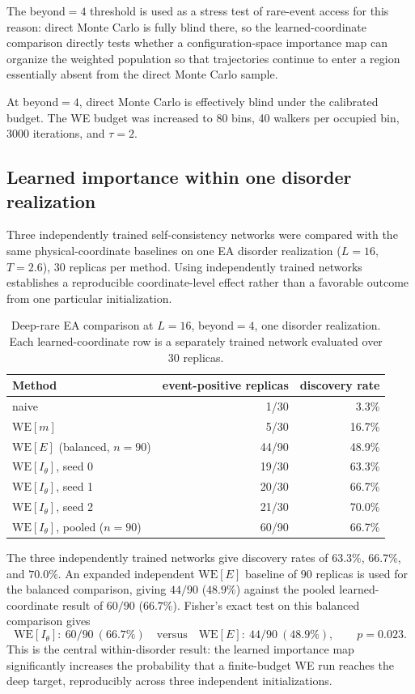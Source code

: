 \documentclass[a4paper,fleqn]{cas-sc}
\newcommand{\WE}{\mathrm{WE}}
\begin{document}
The beyond$=4$ threshold is used as a stress test of rare-event access for this reason: direct
Monte Carlo is fully blind there, so the learned-coordinate comparison directly tests whether a
configuration-space importance map can organize the weighted population so that trajectories
continue to enter a region essentially absent from the direct Monte Carlo sample.

\FloatBarrier

At beyond$=4$, direct Monte Carlo is effectively blind under the calibrated budget. The WE
budget was increased to 80 bins, 40 walkers per occupied bin, 3000 iterations, and $\tau=2$.

\subsection{Learned importance within one disorder realization}\label{sec:deep}\label{sec:deepwithin}
Three independently trained self-consistency networks were compared with the same
physical-coordinate baselines on one EA disorder realization ($L=16$, $T=2.6$), $30$ replicas
per method. Using independently trained networks establishes a reproducible coordinate-level
effect rather than a favorable outcome from one particular initialization.

\begin{table}[H]
\centering\small
\caption{Deep-rare EA comparison at $L=16$, beyond$=4$, one disorder realization. Each
learned-coordinate row is a separately trained network evaluated over 30 replicas.}
\label{tab:deep}
\begin{tabular}{lrr}
\toprule
Method & event-positive replicas & discovery rate \\
\midrule
naive & 1/30 & 3.3\% \\
$\WE[m]$ & 5/30 & 16.7\% \\
$\WE[E]$ (balanced, $n=90$) & 44/90 & 48.9\% \\
$\WE[I_\theta]$, seed 0 & 19/30 & 63.3\% \\
$\WE[I_\theta]$, seed 1 & 20/30 & 66.7\% \\
$\WE[I_\theta]$, seed 2 & 21/30 & 70.0\% \\
$\WE[I_\theta]$, pooled ($n=90$) & 60/90 & 66.7\% \\
\bottomrule
\end{tabular}
\end{table}

The three independently trained networks give discovery rates of $63.3\%$, $66.7\%$, and
$70.0\%$. An expanded independent $\WE[E]$ baseline of $90$ replicas is used for the balanced
comparison, giving $44/90$ ($48.9\%$) against the pooled learned-coordinate result of $60/90$
($66.7\%$). Fisher's exact test on this balanced comparison gives
\begin{equation}
\WE[I_\theta]:\ 60/90\ (66.7\%)\quad\text{versus}\quad\WE[E]:\ 44/90\ (48.9\%),\qquad p=0.023.
\label{eq:withinp}
\end{equation}
This is the central within-disorder result: the learned importance map significantly increases
the probability that a finite-budget WE run reaches the deep target, reproducibly across three
independent initializations.
\end{document}
